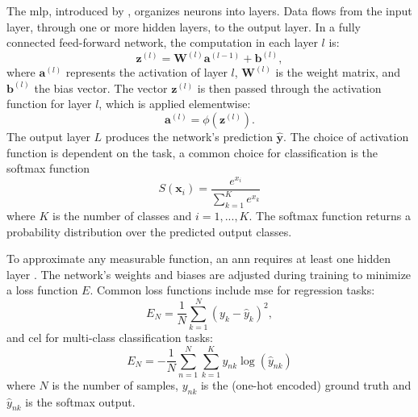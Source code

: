 \documentclass[12pt, a4paper, headinclude, twoside, plainheadsepline, open=right, numbers=noenddot, hidelinks, toc=listof, toc=bibliography]{scrreprt}
\begin{document}
The \ac{mlp}, introduced by \citeauthor{rosenblattPerceptronProbabilisticModel1958} \cite{rosenblattPerceptronProbabilisticModel1958}, organizes neurons into layers. 
Data flows from the input layer, through one or more hidden layers, to the output layer. In a fully connected feed-forward network, the computation in each layer $l$ is:
\begin{equation}
\mathbf{z}^{(l)} = \mathbf{W}^{(l)} \mathbf{a}^{(l-1)} + \mathbf{b}^{(l)},
\end{equation}
where $\mathbf{a}^{(l)}$ represents the activation of layer $l$, $\mathbf{W}^{(l)}$ is the weight matrix, and $\mathbf{b}^{(l)}$ the bias vector. 
The vector $\mathbf{z}^{(l)}$ is then passed through the activation function for layer $l$, which is applied elementwise:
\begin{equation}
\mathbf{a}^{(l)} = \phi (\mathbf{z}^{(l)}).
\end{equation}
The output layer $L$ produces the network's prediction $\mathbf{\hat{y}}$.
The choice of activation function is dependent on the task, a common choice for classification is the softmax function \cite{bridleProbabilisticInterpretationFeedforward1990}
\begin{equation}
\label{eq:softmax}
 S(\mathbf{x}_i) = \frac{e^{x_i}}{\sum_{k=1}^{K} e^{x_k}}
\end{equation}
where $K$ is the number of classes and $i = 1, ..., K$.
The softmax function returns a probability distribution over the predicted output classes.

To approximate any measurable function, an \ac{ann} requires at least one hidden layer \cite{hornikMultilayerFeedforwardNetworks1989}. 
The network's weights and biases are adjusted during training to minimize a loss function $E$.
Common loss functions include \ac{mse} for regression tasks:
\begin{equation}
E_N = \frac{1}{N} \sum_{k=1}^{N}(y_{k} - \hat{y}_{k})^2,
\end{equation}
and \ac{cel} for multi-class classification tasks:
\begin{equation}
E_N = -\frac{1}{N} \sum_{n=1}^{N} \sum_{k=1}^{K} y_{nk} \log (\hat{y}_{nk})
\end{equation}
where $N$ is the number of samples, $y_{nk}$ is the (one-hot encoded) ground truth and $\hat{y}_{nk}$ is the softmax output.
\end{document}
